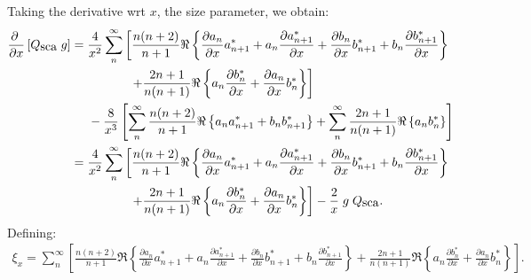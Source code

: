 \documentclass[a4paper,10pt]{article}
\def \Qsca { {Q_{\mbox{\rm sca}}}}
\def \asym { {g} }
\begin{document}
Taking the derivative wrt $x$, the size parameter, we obtain:
\begin{align}
 \frac{\partial\;}{\partial x} \left[\Qsca \; \asym \right] &= 
 \frac{4}{x^2}\sum_n^\infty \left[  \frac{n(n+2)}{n+1} \Re \left\{ 
                                                                \frac{\partial a_n}{\partial x} a^*_{n+1} + 
                                                                a_n \frac{\partial a^*_{n+1}}{\partial x}  +
                                                                \frac{\partial b_n}{\partial x} b^*_{n+1}  + 
                                                                b_n \frac{\partial b^*_{n+1}}{\partial x}
                                                       \right\} \right. \nonumber \\
                             & \;\;\;\;\;\;\;\;\;\;\;\; \;\;\;\;\;
                               \left.+ \frac{2n+1}{n(n+1)} \Re \left\{ a_n \frac{\partial b^*_n}{\partial x} + 
                                    \frac{\partial a_n}{\partial x} b^*_n  \right\}\right]  \nonumber\\
                      &\;\;\;\;\; - \frac{8}{x^3} \left[   \sum_n^\infty \frac{n(n+2)}{n+1} \Re \left\{ a_na^*_{n+1} +  b_n b^*_{n+1}  \right\}
                                    +  \sum_n^\infty \frac{2n+1}{n(n+1)} \Re \left\{ a_n b^*_n \right\}\right] \\
        &=\frac{4}{x^2}\sum_n^\infty \left[  \frac{n(n+2)}{n+1} \Re \left\{ 
                                                                \frac{\partial a_n}{\partial x} a^*_{n+1} + 
                                                                a_n \frac{\partial a^*_{n+1}}{\partial x}  +
                                                                \frac{\partial b_n}{\partial x} b^*_{n+1}  + 
                                                                b_n \frac{\partial b^*_{n+1}}{\partial x}
                                                       \right\} \right. \nonumber \\
                             & \;\;\;\;\;\;\;\;\;\;\;\; \;\;\;\;\;
                               \left.+ \frac{2n+1}{n(n+1)} \Re \left\{ a_n \frac{\partial b^*_n}{\partial x} + 
                                    \frac{\partial a_n}{\partial x} b^*_n  \right\}\right]  - \frac{2}{x} \; \asym \; \Qsca.
\end{align}
Defining:
\begin{align}
\xi_x=\sum_n^\infty \left[  \frac{n(n+2)}{n+1} \Re \left\{ 
                                                                \frac{\partial a_n}{\partial x} a^*_{n+1} + 
                                                                a_n \frac{\partial a^*_{n+1}}{\partial x}  +
                                                                \frac{\partial b_n}{\partial x} b^*_{n+1}  + 
                                                                b_n \frac{\partial b^*_{n+1}}{\partial x}
                                                       \right\}
                               + \frac{2n+1}{n(n+1)} \Re \left\{ a_n \frac{\partial b^*_n}{\partial x} + 
                                    \frac{\partial a_n}{\partial x} b^*_n  \right\}\right].
\end{align}
\end{document}
